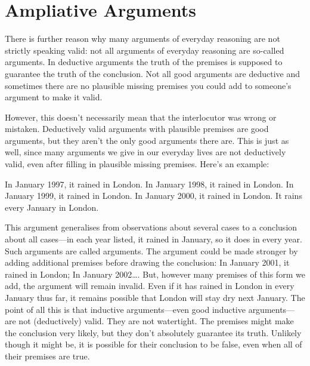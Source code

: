 
\section{Ampliative Arguments}
There is further reason why many arguments of everyday reasoning are not strictly speaking valid: not all arguments of everyday reasoning are so-called  arguments. In deductive arguments the truth of the premises is supposed to guarantee the truth of the conclusion. Not all good arguments are deductive and sometimes there are no plausible missing premises you could add to someone's argument to make it valid.

However, this doesn't necessarily mean that the interlocutor was wrong or mistaken.
Deductively valid arguments with plausible premises are good arguments, but they aren't the only good arguments there are. This is just as well, since many arguments we give in our everyday lives are not deductively valid, even after filling in plausible missing premises. Here's an example:
	\begin{earg}
		\prem In January 1997, it rained in London.
		\prem In January 1998, it rained in London.
		\prem In January 1999, it rained in London.
		\prem In January 2000, it rained in London.
	\conc It rains every January in London.
\end{earg}

This argument generalises from observations about several cases to a conclusion about all cases---in each year listed, it rained in January, so it does in every year. Such arguments are called  arguments. The argument could be made stronger by adding additional premises before drawing the conclusion: In January 2001, it rained in London; In January 2002\ldots. But, however many premises of this form we add, the argument will remain invalid. Even if it has rained in London in every January thus far, it remains possible that London will stay dry next January. The point of all this is that inductive arguments—even good inductive arguments—are not (deductively) valid. They are not watertight. The premises might make the conclusion very likely, but they don't absolutely guarantee its truth. Unlikely though it might be, it is possible for their conclusion to be false, even when all of their premises are true.

